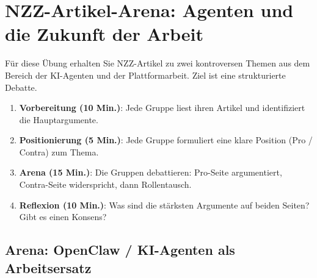 \section{NZZ-Artikel-Arena: Agenten und die Zukunft der Arbeit}

\begin{myattention}
      Für diese Übung erhalten Sie NZZ-Artikel zu zwei kontroversen Themen aus dem Bereich
      der KI-Agenten und der Plattformarbeit. Ziel ist eine strukturierte Debatte.
\end{myattention}

\begin{myprocedure}
      \begin{enumerate}
            \item \textbf{Vorbereitung (10 Min.)}: Jede Gruppe liest ihren Artikel und
                  identifiziert die Hauptargumente.
            \item \textbf{Positionierung (5 Min.)}: Jede Gruppe formuliert eine klare
                  Position (Pro / Contra) zum Thema.
            \item \textbf{Arena (15 Min.)}: Die Gruppen debattieren: Pro-Seite
                  argumentiert, Contra-Seite widerspricht, dann Rollentausch.
            \item \textbf{Reflexion (10 Min.)}: Was sind die stärksten Argumente
                  auf beiden Seiten? Gibt es einen Konsens?
      \end{enumerate}
\end{myprocedure}

\subsection*{Arena: OpenClaw / KI-Agenten als Arbeitsersatz}

